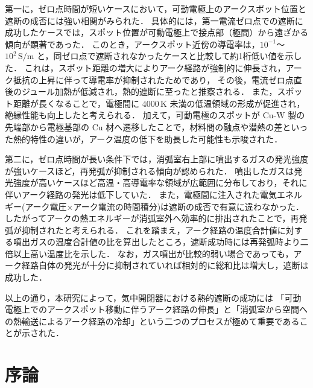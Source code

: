 \documentclass[dvipdfmx,report,uplatex]{jsbook}
\numberwithin{equation}{section}
\numberwithin{figure}{section}
\numberwithin{table}{section}
\begin{document}
第一に，ゼロ点時間が短いケースにおいて，可動電極上のアークスポット位置と遮断の成否には強い相関がみられた．
具体的には，第一電流ゼロ点での遮断に成功したケースでは，スポット位置が可動電極上で接点部（極間）から遠ざかる傾向が顕著であった．
このとき，アークスポット近傍の導電率は，$10^{-1}$～$10^2\,\mathrm{S/m}$ と，同ゼロ点で遮断されなかったケースと比較して約1桁低い値を示した．
これは，スポット距離の増大によりアーク経路が強制的に伸長され，アーク抵抗の上昇に伴って導電率が抑制されたためであり，
その後，電流ゼロ点直後のジュール加熱が低減され，熱的遮断に至ったと推察される．
また，スポット距離が長くなることで，電極間に $4000\,\mathrm{K}$ 未満の低温領域の形成が促進され，絶縁性能も向上したと考えられる．
加えて，可動電極のスポットが Cu-W 製の先端部から電極基部の Cu 材へ遷移したことで，材料間の融点や潜熱の差といった熱的特性の違いが，アーク温度の低下を助長した可能性も示唆された．

第二に，ゼロ点時間が長い条件下では，消弧室右上部に噴出するガスの発光強度が強いケースほど，再発弧が抑制される傾向が認められた．
噴出したガスは発光強度が高いケースほど高温・高導電率な領域が広範囲に分布しており，それに伴いアーク経路の発光は低下していた．
また，電極間に注入された電気エネルギー(アーク電圧×アーク電流の時間積分)は遮断の成否で有意に違わなかった．
したがってアークの熱エネルギーが消弧室外へ効率的に排出されたことで，再発弧が抑制されたと考えられる．
これを踏まえ，アーク経路の温度合計値に対する噴出ガスの温度合計値の比を算出したところ，遮断成功時には再発弧時より二倍以上高い温度比を示した．
なお，ガス噴出が比較的弱い場合であっても，アーク経路自体の発光が十分に抑制されていれば相対的に総和比は増大し，遮断は成功した．

以上の通り，本研究によって，気中開閉器における熱的遮断の成功には
「可動電極上でのアークスポット移動に伴うアーク経路の伸長」と「消弧室から空間への熱輸送によるアーク経路の冷却」という二つのプロセスが極めて重要であることが示された．


\newpage
\setcounter{tocdepth}{2}
\tableofcontents
\thispagestyle{empty}
\clearpage
\pagestyle{plain}
\setcounter{page}{1}

\chapter{序論}
\end{document}
